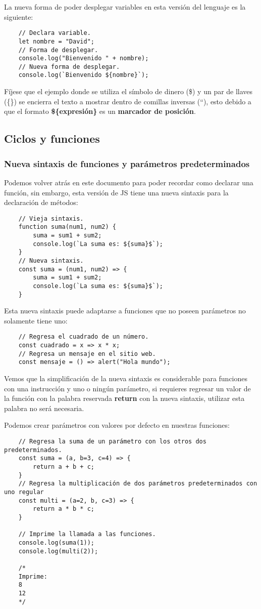 La nueva forma de poder desplegar variables en esta versión del lenguaje es la siguiente:
\begin{lstlisting}
    // Declara variable.
    let nombre = "David";
    // Forma de desplegar.
    console.log("Bienvenido " + nombre);
    // Nueva forma de desplegar.
    console.log(`Bienvenido ${nombre}`);
\end{lstlisting}

Fíjese que el ejemplo donde se utiliza el símbolo de dinero (\$) y un par de llaves (\{\}) se encierra el texto a mostrar dentro de comillas inversas (``), esto debido a que el formato \textbf{\$\{expresión\}} es un \textbf{marcador de posición}.


\subsection{Ciclos y funciones}


\subsubsection{Nueva sintaxis de funciones y parámetros predeterminados}

Podemos volver atrás en este documento para poder recordar como declarar una función, sin embargo, esta versión de JS tiene una nueva sintaxis para la declaración de métodos:
\begin{lstlisting}
    // Vieja sintaxis.
    function suma(num1, num2) {
        suma = sum1 + sum2;
        console.log(`La suma es: ${suma}$`);
    }
    // Nueva sintaxis.
    const suma = (num1, num2) => {
        suma = sum1 + sum2;
        console.log(`La suma es: ${suma}$`);
    }
\end{lstlisting}

Esta nueva sintaxis puede adaptarse a funciones que no poseen parámetros no solamente tiene uno:
\begin{lstlisting}
    // Regresa el cuadrado de un número.
    const cuadrado = x => x * x;
    // Regresa un mensaje en el sitio web.
    const mensaje = () => alert("Hola mundo");
\end{lstlisting}

Vemos que la simplificación de la nueva sintaxis es considerable para funciones con una instrucción y uno o ningún parámetro, si requieres regresar un valor de la función con la palabra reservada \textbf{return} con la nueva sintaxis, utilizar esta palabra no será necesaria.

Podemos crear parámetros con valores por defecto en nuestras funciones:
\begin{lstlisting}
    // Regresa la suma de un parámetro con los otros dos predeterminados.
    const suma = (a, b=3, c=4) => {
        return a + b + c;
    }
    // Regresa la multiplicación de dos parámetros predeterminados con uno regular
    const multi = (a=2, b, c=3) => {
        return a * b * c;
    }

    // Imprime la llamada a las funciones.
    console.log(suma(1));
    console.log(multi(2));

    /*
    Imprime:
    8
    12
    */
\end{lstlisting}

